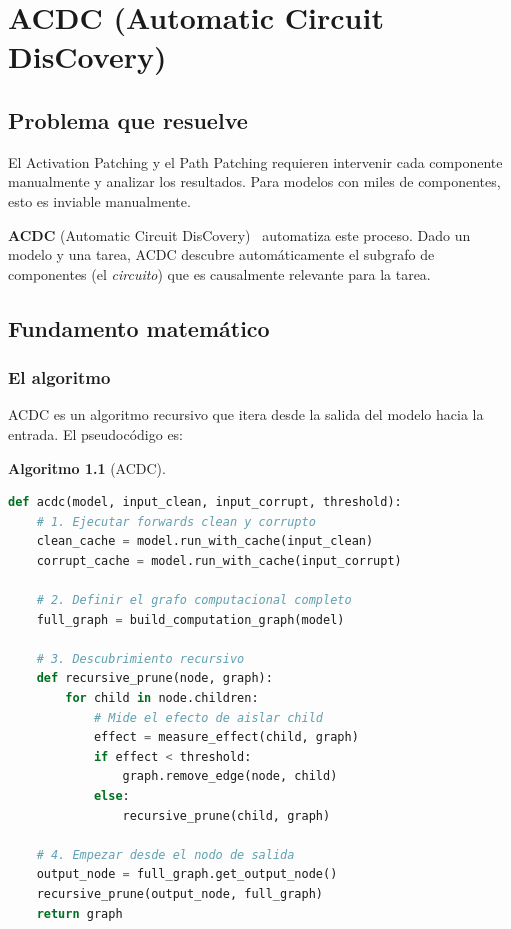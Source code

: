 \documentclass[11pt,a4paper]{report}
\theoremstyle{definition}
\newtheorem{algoritmo}{Algoritmo}[chapter]
\begin{document}
\chapter{ACDC (Automatic Circuit DisCovery)}
\label{ch:acdc}

\section{Problema que resuelve}

El Activation Patching y el Path Patching requieren intervenir cada componente manualmente y analizar los resultados. Para modelos con miles de componentes, esto es inviable manualmente.

\textbf{ACDC} (Automatic Circuit DisCovery)~\cite{conmy2023acdc} automatiza este proceso. Dado un modelo y una tarea, ACDC descubre automáticamente el subgrafo de componentes (el \emph{circuito}) que es causalmente relevante para la tarea.

\section{Fundamento matemático}

\subsection{El algoritmo}

ACDC es un algoritmo recursivo que itera desde la salida del modelo hacia la entrada. El pseudocódigo es:

\begin{algoritmo}[ACDC]
\label{alg:acdc}
\begin{lstlisting}[language=Python]
def acdc(model, input_clean, input_corrupt, threshold):
    # 1. Ejecutar forwards clean y corrupto
    clean_cache = model.run_with_cache(input_clean)
    corrupt_cache = model.run_with_cache(input_corrupt)
    
    # 2. Definir el grafo computacional completo
    full_graph = build_computation_graph(model)
    
    # 3. Descubrimiento recursivo
    def recursive_prune(node, graph):
        for child in node.children:
            # Mide el efecto de aislar child
            effect = measure_effect(child, graph)
            if effect < threshold:
                graph.remove_edge(node, child)
            else:
                recursive_prune(child, graph)
    
    # 4. Empezar desde el nodo de salida
    output_node = full_graph.get_output_node()
    recursive_prune(output_node, full_graph)
    return graph
\end{lstlisting}
\end{algoritmo}
\end{document}

